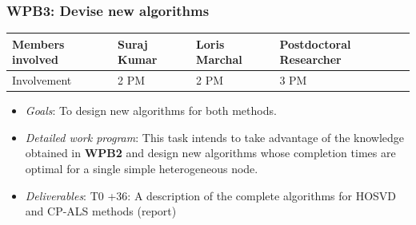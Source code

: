\documentclass[a4paper,11pt]{article}
\newcommand{\subtask}[1]{{\color{orange}\paragraph{#1}$ $}}
\newcommand{\goal}{{\color{orange2}  \emph{Goals}:} }
\newcommand{\dwp}{{\color{orange2}  \emph{Detailed work program}: }}
\newcommand{\deliverables}{{\color{orange2}  \emph{Deliverables}: }}
\begin{document}
	\subsubsection{\textbf{WPB3}: Devise new algorithms}
	\vspace*{-0.385cm}\begin{table}[H]
		\begin{tabular}{llll}
			\hline
			\cellcolor{blue2}
			Members involved & Suraj Kumar& Loris Marchal & Postdoctoral Researcher \\
			\hline
			\cellcolor{orange2}
			Involvement      & 2 PM            & 2 PM & 3 PM \\
			\hline
		\end{tabular}
	\end{table}\vspace*{-0.25cm}
	\begin{itemize}[leftmargin=-1pt]
		\item[] \goal To design new algorithms for both methods. 
		\item[] \dwp This task intends to take advantage of the knowledge obtained in \textbf{WPB2} and design new algorithms whose completion times are optimal for a single simple heterogeneous node.
		\item[] \deliverables T0 +36: A description of the complete algorithms for HOSVD and CP-ALS methods (report)
	\end{itemize}
	
\end{document}

